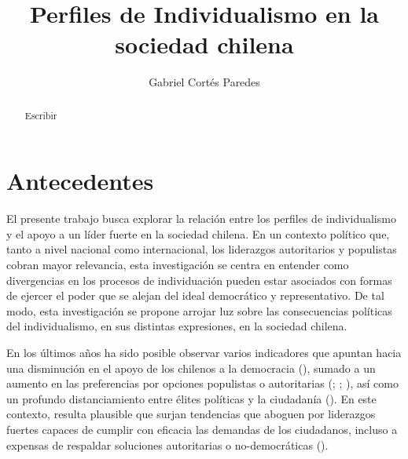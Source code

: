 \documentclass[
  letterpaper,
  DIV=11,
  numbers=noendperiod]{scrartcl}
\title{Perfiles de Individualismo en la sociedad chilena}
\author{Gabriel Cortés Paredes}
\date{}
\begin{document}
\maketitle
\begin{abstract}
Escribir
\end{abstract}


\section*{Antecedentes}\label{antecedentes}

El presente trabajo busca explorar la relación entre los perfiles de
individualismo y el apoyo a un líder fuerte en la sociedad chilena. En
un contexto político que, tanto a nivel nacional como internacional, los
liderazgos autoritarios y populistas cobran mayor relevancia, esta
investigación se centra en entender como divergencias en los procesos de
individuación pueden estar asociados con formas de ejercer el poder que
se alejan del ideal democrático y representativo. De tal modo, esta
investigación se propone arrojar luz sobre las consecuencias políticas
del individualismo, en sus distintas expresiones, en la sociedad
chilena.

En los últimos años ha sido posible observar varios indicadores que
apuntan hacia una disminución en el apoyo de los chilenos a la
democracia (), sumado a un aumento en las
preferencias por opciones populistas o autoritarias
(;
; ), así como un profundo
distanciamiento entre élites políticas y la ciudadanía
(). En este contexto, resulta
plausible que surjan tendencias que aboguen por liderazgos fuertes
capaces de cumplir con eficacia las demandas de los ciudadanos, incluso
a expensas de respaldar soluciones autoritarias o no-democráticas
().
\end{document}
